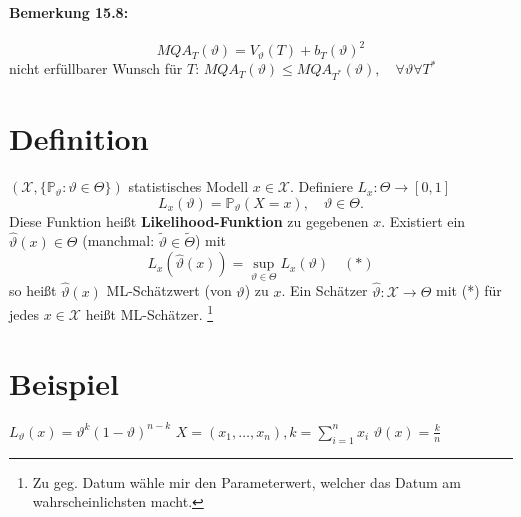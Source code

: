 \documentclass[a4paper,11pt,notitlepage]{report}
\newcommand{\Prim}{{\ensuremath{\mathbb{P}}}}
\begin{document}
\paragraph{Bemerkung 15.8:}
$$MQA_T(\vartheta) = V_\vartheta(T) + b_T(\vartheta)^2$$
nicht erfüllbarer Wunsch für $T$: $MQA_T(\vartheta) \leq MQA_{T^*}(\vartheta), \quad \forall \vartheta \forall T^*$

\section{Definition}
$(\mathcal{X}, \{ \Prim_\vartheta \colon \vartheta \in \Theta\})$ statistisches Modell
\newline
$x \in \mathcal{X}$. Definiere $L_x \colon \Theta \rightarrow [0,1]$
$$L_x(\vartheta) = \Prim_\vartheta (X=x), \quad \vartheta \in \Theta.$$
Diese Funktion heißt \textbf{Likelihood-Funktion} zu gegebenen $x$. Existiert ein $\hat{\vartheta}(x) \in \Theta$ (manchmal: $\widetilde{\vartheta} \in \widetilde{\Theta}$) mit
$$L_x(\hat{\vartheta}(x)) = \sup\limits_{\vartheta \in \Theta}{L_x(\vartheta)} \quad (*)$$
so heißt $\hat{\vartheta}(x)$ ML-Schätzwert (von $\vartheta$) zu $x$.
\newline
Ein Schätzer $\hat{\vartheta} \colon \mathcal{X} \rightarrow \Theta$ mit (*) für jedes $x \in \mathcal{X}$ heißt ML-Schätzer.
\footnote{Zu geg. Datum wähle mir den Parameterwert, welcher das Datum am wahrscheinlichsten macht.}

\section{Beispiel}
$L_\vartheta(x) = \vartheta^k (1-\vartheta)^{n-k}$
\newline
$X=(x_1, \ldots, x_n), k = \sum\limits_{i=1}^n{x_i}$
\newline
$\hat{\vartheta}(x) = \frac{k}{n}$
\end{document}
